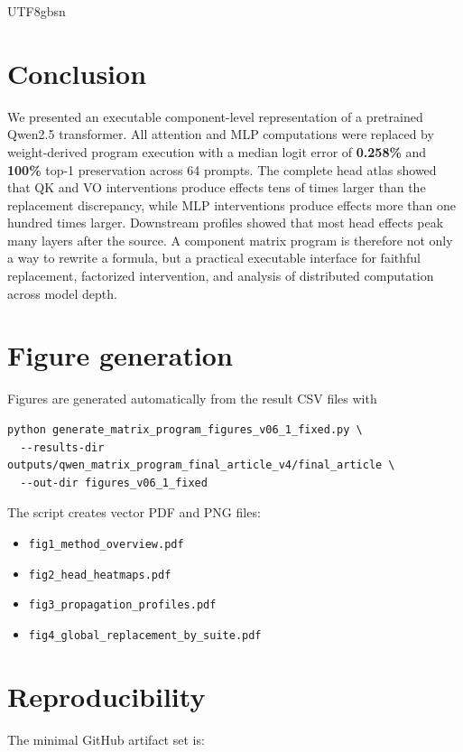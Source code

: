 \documentclass[11pt]{article}
\providecommand{\tightlist}{\setlength{\itemsep}{0pt}\setlength{\parskip}{0pt}}
\begin{document}
\begin{CJK*}{UTF8}{gbsn}
\section{Conclusion}

We presented an executable component-level representation of a
pretrained Qwen2.5 transformer. All attention and MLP computations were
replaced by weight-derived program execution with a median logit error
of \textbf{0.258\%} and \textbf{100\%} top-1 preservation across 64
prompts. The complete head atlas showed that QK and VO interventions
produce effects tens of times larger than the replacement discrepancy,
while MLP interventions produce effects more than one hundred times
larger. Downstream profiles showed that most head effects peak many
layers after the source. A component matrix program is therefore not
only a way to rewrite a formula, but a practical executable interface
for faithful replacement, factorized intervention, and analysis of
distributed computation across model depth.

\appendix
\section{Figure generation}

Figures are generated automatically from the result CSV files with

\begin{verbatim}
python generate_matrix_program_figures_v06_1_fixed.py \
  --results-dir outputs/qwen_matrix_program_final_article_v4/final_article \
  --out-dir figures_v06_1_fixed
\end{verbatim}

The script creates vector PDF and PNG files:

\begin{itemize}
\tightlist
\item
  \texttt{fig1\_method\_overview.pdf}
\item
  \texttt{fig2\_head\_heatmaps.pdf}
\item
  \texttt{fig3\_propagation\_profiles.pdf}
\item
  \texttt{fig4\_global\_replacement\_by\_suite.pdf}
\end{itemize}

\section{Reproducibility}

The minimal GitHub artifact set is:


\end{CJK*}
\end{document}
